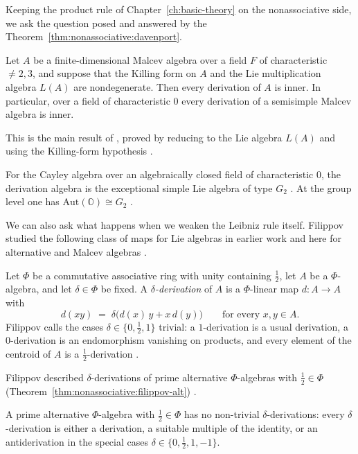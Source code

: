 Keeping the product rule of Chapter~\ref{ch:basic-theory} on the
nonassociative side, we ask the question posed and answered by the
Theorem~\ref{thm:nonassociative:davenport}.

\begin{theorem}
\label{thm:nonassociative:davenport}
Let $A$ be a finite-dimensional Malcev algebra over a field $F$ of
characteristic $\neq 2,3$, and suppose that the Killing form on $A$ and
the Lie multiplication algebra $L(A)$ are nondegenerate. Then every
derivation of $A$ is inner. In particular, over a field of
characteristic $0$ every derivation of a semisimple Malcev algebra is
inner.
\end{theorem}

This is the main result of \cite{Davenport1972Malcev}, proved by
reducing to the Lie algebra $L(A)$ and using the Killing-form hypothesis
\cite[p.~565]{Davenport1972Malcev}.

For the Cayley algebra over an algebraically closed field of
characteristic $0$, the derivation algebra is the exceptional simple Lie
algebra of type $G_{2}$ \cite[p.~52]{McCrimmon2004Taste}. At the group
level one has $\mathrm{Aut}(\mathbb{O})\cong G_2$
\cite[p.~159]{Baez2002Octonions}.

We can also ask what happens when we weaken the Leibniz rule itself.
Filippov studied the following class of maps for Lie algebras in earlier
work and here for alternative and Malcev algebras
\cite[Introduction, p.~354]{Filippov2000DeltaAlternative}.

\begin{definition}
\label{def:nonassociative:delta-derivation}
Let $\Phi$ be a commutative associative ring with unity containing
$\tfrac12$, let $A$ be a $\Phi$-algebra, and let $\delta\in\Phi$ be
fixed. A \emph{$\delta$-derivation} of $A$ is a $\Phi$-linear map
$d\colon A\to A$ with
\[
d(xy)\;=\;\delta\bigl(d(x)\,y+x\,d(y)\bigr)
\qquad\text{for every }x,y\in A.
\]
Filippov calls the cases $\delta\in\{0,\tfrac12,1\}$ trivial: a
$1$-derivation is a usual derivation, a $0$-derivation is an
endomorphism vanishing on products, and every element of the centroid
of $A$ is a $\tfrac12$-derivation
\cite[Introduction, p.~354]{Filippov2000DeltaAlternative}.
\end{definition}

Filippov described $\delta$-derivations of prime alternative
$\Phi$-algebras with $\tfrac12\in\Phi$ (Theorem~\ref{thm:nonassociative:filippov-alt})
\cite[Theorem~2, p.~356]{Filippov2000DeltaAlternative}.\begin{theorem}
\label{thm:nonassociative:filippov-alt}
A prime alternative $\Phi$-algebra with $\tfrac{1}{2}\in\Phi$ has no
non-trivial $\delta$-derivations: every $\delta$-derivation is either a
derivation, a suitable multiple of the identity, or an antiderivation
in the special cases $\delta\in\{0,\tfrac12,1,-1\}$.
\end{theorem}

